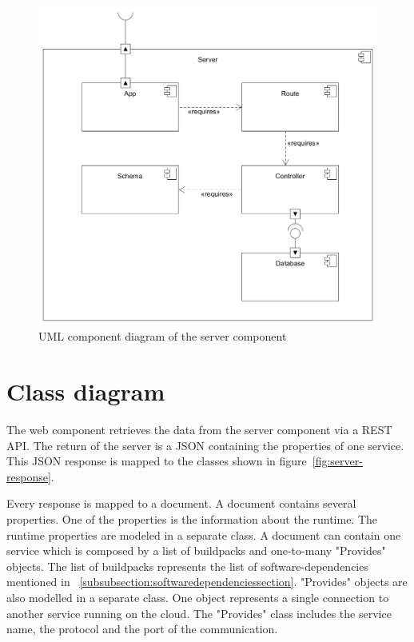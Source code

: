 \begin{figure}[htpb]
  \centering
  \includegraphics[width=1.0\textwidth]{figures/server-componentdiagram.PNG}
  \caption{UML component diagram of the server component}
  \label{fig:server-component}
\end{figure}

\section{Class diagram}

The web component retrieves the data from the server component via a REST API. The return of the server is a JSON containing the properties of one service. This JSON response is mapped to the classes shown in figure~\ref{fig:server-response}.

Every response is mapped to a document. A document contains several properties. One of the properties is the information about the runtime. The runtime properties are modeled in a separate class. A document can contain one service which is composed by a list of buildpacks and one-to-many "Provides" objects. The list of buildpacks represents the list of software-dependencies mentioned in ~\ref{subsubsection:softwaredependenciessection}.
"Provides" objects are also modelled in a separate class. One object represents a single connection to another service running on the cloud. The "Provides" class includes the service name, the protocol and the port of the communication.

